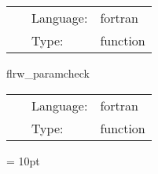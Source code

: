  \begin{tabular*}{160mm}{cll} 
~ & Language:  & fortran \\ 
~ & Type:  & function \\ 
\end{tabular*} 


\vspace{5mm}


\hspace{5mm} flrw\_paramcheck 

\hspace{5mm}{\it check some parameters are set correctly } 


\hspace{5mm}

 \begin{tabular*}{160mm}{cll} 
~ & Language:  & fortran \\ 
~ & Type:  & function \\ 
\end{tabular*} 



\vspace{5mm}\parskip = 10pt 

